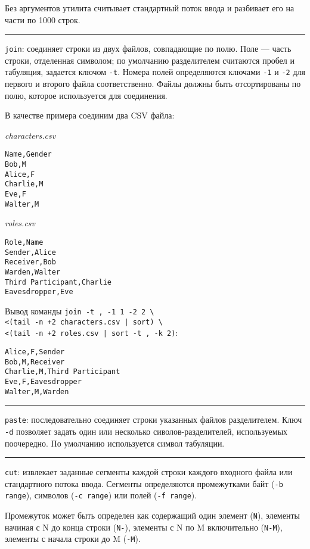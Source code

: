 \documentclass[listings]{labreport}
\begin{document}
Без аргументов утилита считывает стандартный поток ввода и разбивает его на части по 1000 строк.

\noindent\rule{\textwidth}{1pt}

\texttt{join}: соединяет строки из двух файлов, совпадающие по полю. Поле — часть строки, отделенная символом;
по умолчанию разделителем считаются пробел и табуляция, задается ключом \texttt{-t}. Номера полей определяются
ключами \texttt{-1} и \texttt{-2} для первого и второго файла соответственно. Файлы должны быть отсортированы по
полю, которое используется для соединения.

В качестве примера соединим два CSV файла:

\begin{multicols}{2}
\noindent\textit{characters.csv}
\begin{verbatim}
Name,Gender
Bob,M
Alice,F
Charlie,M
Eve,F
Walter,M
\end{verbatim}

\noindent\textit{roles.csv}
\begin{verbatim}
Role,Name
Sender,Alice
Receiver,Bob
Warden,Walter
Third Participant,Charlie
Eavesdropper,Eve
\end{verbatim}
\end{multicols}

Вывод команды \texttt{join -t , -1 1 -2 2 {\textbackslash}} \\
\texttt{<(tail -n +2 characters.csv | sort) {\textbackslash}} \\
\texttt{<(tail -n +2 roles.csv | sort -t , -k 2)}:

\begin{verbatim}
Alice,F,Sender
Bob,M,Receiver
Charlie,M,Third Participant
Eve,F,Eavesdropper
Walter,M,Warden
\end{verbatim}

\noindent\rule{\textwidth}{1pt}

\texttt{paste}: последовательно соединяет строки указанных файлов разделителем.
Ключ \texttt{-d} позволяет задать один или несколько сиволов-разделителей, используемых
поочередно. По умолчанию используется символ табуляции.

\noindent\rule{\textwidth}{1pt}

\texttt{cut}: извлекает заданные сегменты каждой строки каждого входного файла или
стандартного потока ввода. Сегменты определяются промежутками байт (\texttt{-b range}),
символов (\texttt{-c range}) или полей (\texttt{-f range}).

Промежуток может быть определен как содержащий один элемент (\texttt{N}), элементы
начиная с N до конца строки (\texttt{N-}), элементы с N по M включительно (\texttt{N-M}),
элементы с начала строки до M (\texttt{-M}).
\end{document}
